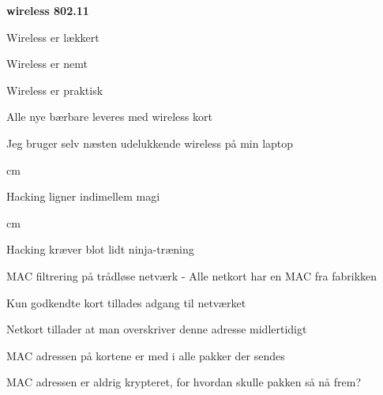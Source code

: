 \documentclass[20pt,landscape,a4paper,footrule]{foils}
\begin{document}

\centerline{\color{titlecolor}\LARGE\bf wireless 802.11}


\begin{list1}
\item Wireless er lækkert
\item Wireless er nemt
\item Wireless er praktisk
\item Alle nye bærbare leveres med wireless kort
\item Jeg bruger selv næsten udelukkende wireless på min laptop
\end{list1}



 cm

\centerline{Hacking ligner indimellem  magi}




 cm
\centerline{Hacking kræver blot lidt ninja-træning}




\begin{list1}
\item MAC filtrering på trådløse netværk - Alle netkort har en MAC fra fabrikken
\item Kun godkendte kort tillades adgang til netværket
\item Netkort tillader at man overskriver denne adresse midlertidigt
\item MAC adressen på kortene er med i alle pakker der sendes
\item MAC adressen er aldrig krypteret, for hvordan skulle pakken så
  nå frem?
\end{list1}


\end{document}

